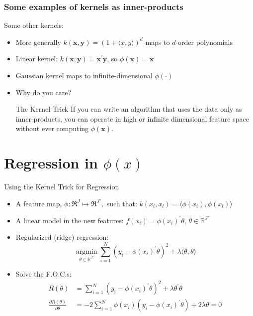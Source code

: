 \documentclass{beamer}
\numberwithin{equation}{section}
\begin{document}
\begin{frame}
\frametitle{Some examples of kernels as inner-products}
Some other kernels:
\begin{itemize}
  \item<1-> \small{More generally $k(\boldsymbol{x},\boldsymbol{y})=(1+\langle x,y \rangle)^d$ maps to $d$-order polynomials}
  \item<2-> Linear kernel: $k(\boldsymbol{x},\boldsymbol{y})=\boldsymbol{x}^{'}\boldsymbol{y}$, so $\phi(\boldsymbol{x})=\boldsymbol{x}$
  \item<3-> Gaussian kernel maps to infinite-dimensional $\phi(\cdot)$
  \bigskip
  \item<4->[]\hspace{-.3in} \alert{Why do you care?}
  \footnotesize{
\begin{block}{The Kernel Trick}
If you can write an algorithm that uses the data only as inner-products, you can operate in high or infinite dimensional feature space without ever computing $\phi(\boldsymbol{x})$.
\end{block}
}
\end{itemize}
\end{frame}

\section{Regression in $\phi(x)$}
\begin{frame}{Using the Kernel Trick for Regression}
\begin{itemize}
\footnotesize
\item<1-> A feature map, $\phi: \Re^J \mapsto \Re^{J'},$ such that: $k(x_i,x_l)=\langle \phi(x_i),\phi(x_l) \rangle$
\smallskip
\item<2-> A linear model in the new features: $f(x_i)=\phi(x_i)^{'}\theta$, $\theta \in \mathbb{R}^{J'}$
\item<3-> Regularized (ridge) regression: \\
$$\underset{\theta \in \mathbb{R}^{J'}}{\operatorname{argmin}} \sum_{i=1}^{N} (y_i-\phi(x_i)^{'}\theta)^2+\lambda \langle \theta,\theta \rangle$$
\item<4-> Solve the F.O.C.s:
\scriptsize
\begin{align}
 R(\theta)&= \sum_{i=1}^{N} (y_i-\phi(x_i)^{'}\theta)^2+\lambda \theta^{'} \theta \nonumber  \\
 \frac{\partial R(\theta)}{\partial \theta} &=  -2 \sum_{i=1}^{N} \phi(x_i)(y_i-\phi(x_i)^{'}\theta) + 2\lambda \theta = 0 \nonumber
\end{align}
\end{itemize}
\end{frame}
\end{document}
